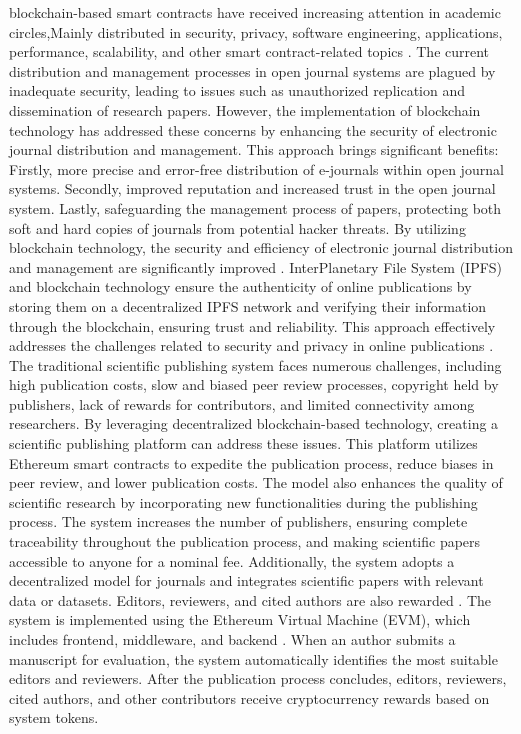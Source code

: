\documentclass[lettersize,journal]{IEEEtran}
\begin{document}
blockchain-based smart contracts have received increasing attention in academic circles,Mainly distributed in security, privacy, software engineering, applications, performance, scalability, and other smart contract-related topics \cite{8756390}. 
The current distribution and management processes in open journal systems are plagued by inadequate security, leading to issues such as unauthorized replication and dissemination of research papers. However, the implementation of blockchain technology has addressed these concerns by enhancing the security of electronic journal distribution and management. This approach brings significant benefits: Firstly, more precise and error-free distribution of e-journals within open journal systems. Secondly, improved reputation and increased trust in the open journal system. Lastly, safeguarding the management process of papers, protecting both soft and hard copies of journals from potential hacker threats. By utilizing blockchain technology, the security and efficiency of electronic journal distribution and management are significantly improved \cite{agustin2020blockchain}.
InterPlanetary File System (IPFS) and blockchain technology ensure the authenticity of online publications by storing them on a decentralized IPFS network and verifying their information through the blockchain, ensuring trust and reliability. This approach effectively addresses the challenges related to security and privacy in online publications \cite{nizamuddin2018ipfs}.
The traditional scientific publishing system faces numerous challenges, including high publication costs, slow and biased peer review processes, copyright held by publishers, lack of rewards for contributors, and limited connectivity among researchers. By leveraging decentralized blockchain-based technology, creating a scientific publishing platform can address these issues. This platform utilizes Ethereum smart contracts to expedite the publication process, reduce biases in peer review, and lower publication costs. The model also enhances the quality of scientific research by incorporating new functionalities during the publishing process. The system increases the number of publishers, ensuring complete traceability throughout the publication process, and making scientific papers accessible to anyone for a nominal fee. Additionally, the system adopts a decentralized model for journals and integrates scientific papers with relevant data or datasets. Editors, reviewers, and cited authors are also rewarded \cite{becstacs2023novel}. The system is implemented using the Ethereum Virtual Machine (EVM), which includes frontend, middleware, and backend  \cite{9093840}. When an author submits a manuscript for evaluation, the system automatically identifies the most suitable editors and reviewers. After the publication process concludes, editors, reviewers, cited authors, and other contributors receive cryptocurrency rewards based on system tokens.
\end{document}
